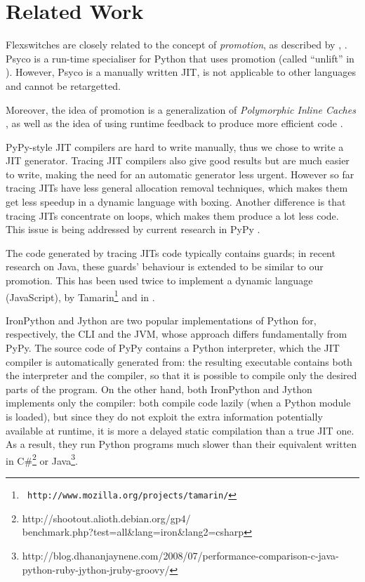 \section{Related Work}

Flexswitches are closely related to the concept of \emph{promotion}, as
described by \cite{PyPyJIT}, \cite{PyPyJIT09}.
Psyco is
a run-time specialiser for Python that uses promotion (called ``unlift'' in
\cite{DBLP:conf/pepm/Rigo04}). However, Psyco is a manually written JIT, is
not applicable to other languages and cannot be retargetted.

Moreover, the idea of promotion is a generalization of \emph{Polymorphic
  Inline Caches} \cite{hoelzle_optimizing_1991}, as well as the idea of using
runtime feedback to produce more efficient code
\cite{hoelzle_type_feedback_1994}.

PyPy-style JIT compilers are hard to write manually, thus we chose to write a
JIT generator.  Tracing JIT compilers \cite{gal_hotpathvm_2006} also give
good results but are much easier to write, making the need for an automatic
generator less urgent.  However so far tracing JITs have less general
allocation removal techniques, which makes them get less speedup in a dynamic
language with boxing.  Another difference is that tracing JITs concentrate on
loops, which makes them produce a lot less code.  This issue is being addressed
by current research in PyPy \cite{PyPyTracing}.

The code generated by tracing JITs code typically contains guards; in recent research
\cite{gal_incremental_2006} on Java, these guards' behaviour is extended to be
similar to our promotion.  This has been used twice to implement a dynamic
language (JavaScript), by Tamarin\footnote{{\tt
http://www.mozilla.org/projects/tamarin/}} and in \cite{chang_efficient_2007}.

IronPython and Jython are two popular implementations of Python for,
respectively, the CLI and the JVM, whose approach differs fundamentally from
PyPy.  The source code of PyPy contains a Python interpreter, which the JIT
compiler is automatically generated from: the resulting executable contains
both the interpreter and the compiler, so that it is possible to compile only
the desired parts of the program.  On the other hand, both IronPython and
Jython implements only the compiler: both compile code lazily (when a Python
module is loaded), but since they do not exploit the extra information
potentially available at runtime, it is more a delayed static compilation than
a true JIT one.  As a result, they run Python programs much slower than their
equivalent written in
C\#\footnote{http://shootout.alioth.debian.org/gp4/\\benchmark.php?test=all\&lang=iron\&lang2=csharp}
or
Java\footnote{http://blog.dhananjaynene.com/2008/07/performance-comparison-c-java-python-ruby-jython-jruby-groovy/}.

